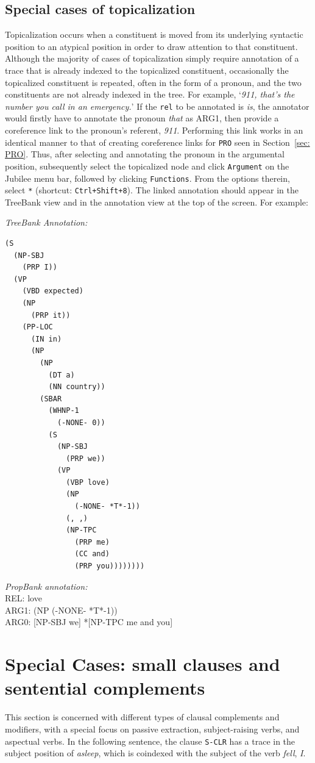 \documentclass[11pt]{report}
\begin{document}
\subsection{Special cases of topicalization}
\label{sec: specialTopicalization}
Topicalization occurs when a constituent is moved from its underlying syntactic position to an atypical position in order to draw attention to that constituent.  Although the majority of cases of topicalization simply require annotation of a trace that is already indexed to the topicalized constituent, occasionally the topicalized constituent is repeated, often in the form of a pronoun, and the two constituents are not already indexed in the tree.  For example, `\textit{911, that's the number you call in an emergency.}'  If the \texttt{rel} to be annotated is \textit{is}, the annotator would firstly have to annotate the pronoun \textit{that} as ARG1, then provide a coreference link to the pronoun's referent, \textit{911}.  Performing this link works in an identical manner to that of creating coreference links for \texttt{PRO} seen in Section~\ref{sec: PRO}.  Thus, after selecting and annotating the pronoun in the argumental position, subsequently select the topicalized node and click {\tt Argument} on the Jubilee menu bar, followed by clicking {\tt Functions}.  From the options therein, select \texttt{*} (shortcut: \texttt{Ctrl+Shift+8}).  The linked annotation should appear in the TreeBank view and in the annotation view at the top of the screen.  For example: 

\textit{TreeBank Annotation:}
\begin{verbatim}
(S
  (NP-SBJ
    (PRP I))
  (VP
    (VBD expected)
    (NP
      (PRP it))
    (PP-LOC
      (IN in)
      (NP
        (NP
          (DT a)
          (NN country))
        (SBAR
          (WHNP-1
            (-NONE- 0))
          (S
            (NP-SBJ
              (PRP we))
            (VP
              (VBP love)
              (NP
                (-NONE- *T*-1))
              (, ,)
              (NP-TPC
                (PRP me)
                (CC and)
                (PRP you))))))))
\end{verbatim}

\textit{PropBank annotation:}\\
REL: love\\
ARG1: (NP (-NONE- *T*-1))\\
ARG0: [NP-SBJ we] *[NP-TPC me and you]

 \section{Special Cases: small clauses and sentential complements}
 \label{sec: smallClauses}
This section is concerned with different types of clausal complements and modifiers, with a special focus on passive extraction, subject-raising verbs, and aspectual verbs. 
In the following sentence, the clause \texttt{S-CLR} has a trace in the subject position of \textit{asleep}, which is coindexed with the subject of the verb \textit{fell}, \textit{I}. 
\end{document}
